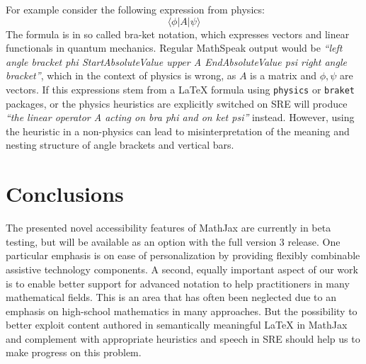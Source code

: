 \documentclass{sig-alternate}
\begin{document}
For example consider the following expression from physics:
\[\langle \phi |A|\psi \rangle\]
The formula is in so called bra-ket notation, which expresses vectors and linear
functionals in quantum mechanics. Regular MathSpeak output would be \emph{``left
  angle bracket phi StartAbsoluteValue upper A EndAbsoluteValue psi right angle
  bracket''}, which in the context of physics is wrong, as $A$ is a matrix and
$\phi,\psi$ are vectors. If this expressions stem from a {\LaTeX} formula using
\texttt{physics} or \texttt{braket} packages, or the physics heuristics are
explicitly switched on SRE will produce \emph{``the linear operator A acting on
  bra phi and on ket psi''} instead. However, using the heuristic in a
non-physics can lead to misinterpretation of the meaning and nesting structure
of angle brackets and vertical bars.








\section{Conclusions}
\label{sec:conc}

The presented novel accessibility features of MathJax are currently in beta
testing, but will be available as an option with the full version 3 release. One
particular emphasis is on ease of personalization by providing flexibly
combinable assistive technology components. A second, equally important aspect
of our work is to enable better support for advanced notation to help
practitioners in many mathematical fields. This is an area that has often been
neglected due to an emphasis on high-school mathematics in many approaches. But
the possibility to better exploit content authored in semantically meaningful
{\LaTeX} in MathJax and complement with appropriate heuristics and speech in SRE
should help us to make progress on this problem.
\end{document}
